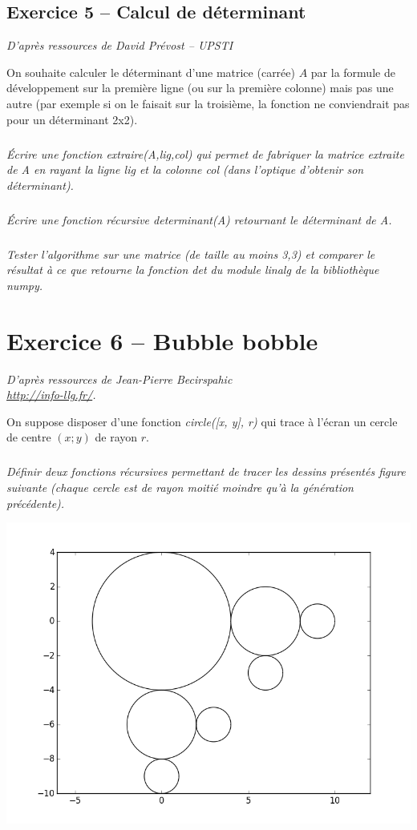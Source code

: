 \documentclass[10pt,fleqn]{article} %
\begin{document}
\begin{multicols}{2}
\subsection*{Exercice 5 -- Calcul de déterminant}
\setcounter{subparagraph}{0}

\textit{D'après ressources de David Prévost -- UPSTI}

On souhaite calculer le déterminant d’une matrice (carrée) $A$ par la formule de développement
sur la première ligne (ou sur la première colonne) mais pas une autre (par exemple si on le
faisait sur la troisième, la fonction ne conviendrait pas pour un déterminant 2x2).
\subparagraph{}
\textit{Écrire une fonction \textsl{extraire(A,lig,col)} qui permet de fabriquer la matrice
extraite de \textsl{A} en rayant la ligne \textsl{lig} et la colonne \textsl{col} (dans l’optique d’obtenir son déterminant).}

\subparagraph{}
\textit{Écrire une fonction récursive \textsl{determinant(A)} retournant le déterminant de \textsl{A}.}

\subparagraph{}
\textit{Tester l’algorithme sur une matrice (de taille au moins 3,3) et comparer le résultat à ce
que retourne la fonction \textsl{det} du module \textsl{linalg} de la bibliothèque \textsl{numpy}.}


\section*{Exercice 6 -- Bubble bobble}
\textit{ D'après ressources de Jean-Pierre Becirspahic   \\ \indent \url{http://info-llg.fr/}.}
\setcounter{subparagraph}{0}

On suppose disposer d’une fonction \textsl{circle([x, y], r)} qui trace à l’écran un cercle de centre
$(x;y)$ de rayon $r$. 
\subparagraph*{}
\textit{Définir deux fonctions récursives permettant de tracer les dessins présentés figure suivante (chaque cercle est de rayon moitié moindre qu’à la génération précédente).}

\begin{center}
\includegraphics[width=.95\linewidth]{images/fig_03}
\end{center}


\end{multicols}
\end{document}
